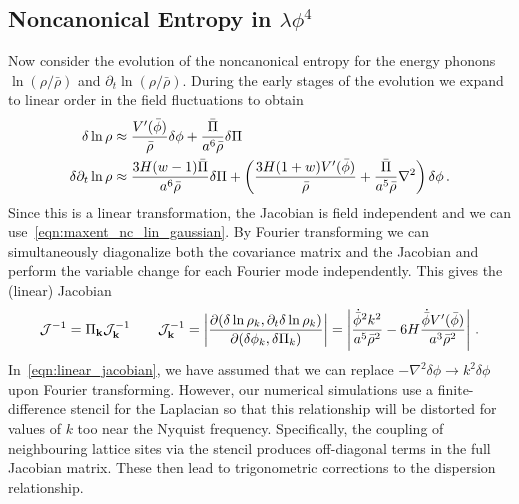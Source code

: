 \documentclass[11pt,a4paper]{article}
\def\lnr{\ln(\rho/\bar{\rho})}
\def\dlnr{\partial_t\ln(\rho/\bar{\rho})}
\begin{document}
\subsection{Noncanonical Entropy in $\lambda\phi^4$}
Now consider the evolution of the noncanonical entropy for the energy phonons $\lnr$ and $\dlnr$.
During the early stages of the evolution we expand to linear order in the field fluctuations to obtain
\begin{align}
   \delta\ln\rho &\approx \frac{V'(\bar{\phi})}{\bar{\rho}}\delta\phi + \frac{\bar{\Pi}}{a^6\bar{\rho}}\delta\Pi \notag\\
  \delta\partial_t\ln\rho &\approx \frac{3H(w-1)\bar{\Pi}}{a^6\bar{\rho}}\delta\Pi + \left(\frac{3H(1+w)V'(\bar{\phi})}{\bar{\rho}} + \frac{\bar{\Pi}}{a^5\bar{\rho}}\nabla^2 \right)\delta\phi \, .
  \label{eqn:linear_transform}
\end{align}
Since this is a linear transformation, the Jacobian is field independent and we can use~\eqref{eqn:maxent_nc_lin_gaussian}.
By Fourier transforming we can simultaneously diagonalize both the covariance matrix and the Jacobian and perform the variable change for each Fourier mode independently.
This gives the (linear) Jacobian
\begin{equation}
  \mathcal{J}^{-1} = \Pi_{\bf k}\mathcal{J}_{\bf k}^{-1} \qquad \mathcal{J}_{\bf k}^{-1} = \left|\frac{\partial(\delta\ln\rho_k,\partial_t\delta\ln\rho_k)}{\partial(\delta\phi_k,\delta\Pi_k)}\right| = \left| \frac{\dot{\bar{\phi}}^2k^2}{a^5\bar{\rho}^2} - 6H\frac{\dot{\bar{\phi}}V'(\bar{\phi})}{a^3\bar{\rho}^2} \right| \, .
  \label{eqn:linear_jacobian}
\end{equation}
In~\eqref{eqn:linear_jacobian}, we have assumed that we can replace $-\nabla^2\delta\phi \to k^2\delta\phi$ upon Fourier transforming.
However, our numerical simulations use a finite-difference stencil for the Laplacian so that this relationship will be distorted for values of $k$ too near the Nyquist frequency.
Specifically, the coupling of neighbouring lattice sites via the stencil produces off-diagonal terms in the full Jacobian matrix.  These then lead to trigonometric corrections to the dispersion relationship.
\end{document}
